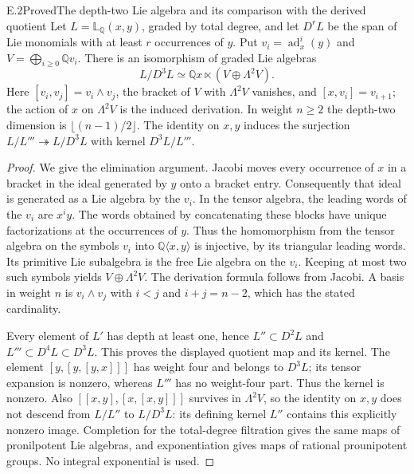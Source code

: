\begin{statement}{E.2}{Proved}{The depth-two Lie algebra and its comparison with the derived quotient}
Let $L=\mathbb L_{\mathbb Q}(x,y)$, graded by total degree, and let
$D^rL$ be the span of Lie monomials with at least $r$ occurrences of
$y$. Put $v_i=\operatorname{ad}_x^i(y)$ and
$V=\bigoplus_{i\geq0}\mathbb Qv_i$. There is an isomorphism of graded
Lie algebras
\[
 L/D^3L\simeq \mathbb Qx\ltimes(V\oplus\Lambda^2V).
\]
Here $[v_i,v_j]=v_i\wedge v_j$, the bracket of $V$ with
$\Lambda^2V$ vanishes, and $[x,v_i]=v_{i+1}$; the action of $x$
on $\Lambda^2V$ is the induced derivation. In weight $n\geq2$ the
depth-two dimension is $\lfloor(n-1)/2\rfloor$.
The identity on $x,y$ induces the surjection
$L/L'''\twoheadrightarrow L/D^3L$ with kernel $D^3L/L'''$.
\end{statement}
\begin{proof}
We give the elimination argument. Jacobi moves every occurrence of
$x$ in a bracket in the ideal generated by $y$ onto a bracket entry.
Consequently that ideal is generated as a Lie algebra by the $v_i$.
In the tensor algebra, the leading words of the $v_i$ are $x^iy$.
The words obtained by concatenating these blocks have unique
factorizations at the occurrences of $y$. Thus the homomorphism
from the tensor algebra on the symbols $v_i$ into
$\mathbb Q\langle x,y\rangle$ is injective, by its triangular leading
words. Its primitive Lie subalgebra is the free Lie algebra on the
$v_i$. Keeping at most two such symbols yields $V\oplus\Lambda^2V$.
The derivation formula follows from Jacobi. A basis in weight $n$
is $v_i\wedge v_j$ with $i<j$ and $i+j=n-2$, which has the stated
cardinality.

Every element of $L'$ has depth at least one, hence
$L''\subset D^2L$ and $L'''\subset D^4L\subset D^3L$.
This proves the displayed quotient map and its kernel.
The element $[y,[y,[y,x]]]$ has weight four and belongs to $D^3L$;
its tensor expansion is nonzero, whereas $L'''$ has no weight-four
part. Thus the kernel is nonzero. Also
$[[x,y],[x,[x,y]]]$ survives in $\Lambda^2V$, so the identity on
$x,y$ does not descend from $L/L''$ to $L/D^3L$: its defining
kernel $L''$ contains this explicitly nonzero image.
Completion for the total-degree filtration gives the same maps of
pronilpotent Lie algebras, and exponentiation gives maps of rational
prounipotent groups. No integral exponential is used.
\end{proof}

